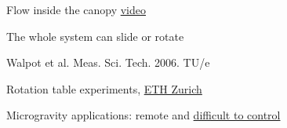 \begin{frame}[label=app-19]{Flow inside the canopy \href{https://www.dropbox.com/s/9x43i2uk9q38fho/flow_inside_laser.mp4?raw=1}{video}}
    \centering
\end{frame}
    

\begin{frame}[label=app-12]{The whole system can slide or rotate}
    \centering{}
    \begin{cardTiny} 
        Walpot et al. Meas. Sci. Tech. 2006. TU/e
    \end{cardTiny}
\end{frame}
    

\begin{frame}[label=app-6]{Rotation table experiments, \href{https://www.dropbox.com/s/933wsb9xdahbyi9/rotation.mp4?raw=1}{ETH Zurich}}
    \centering {}
\end{frame}
    
  
\begin{frame}[label=app-7]{Microgravity applications: remote and \href{https://www.dropbox.com/s/59ophf177gcfjzq/boiling_microgravity.mp4?raw=1}{difficult to control}}   
    \centering
        
\end{frame}



